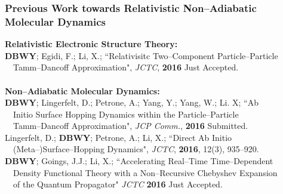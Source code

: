 \documentclass[usepdftitle=false,10pt]{beamer}
\begin{document}
\begin{frame}
  \frametitle{Previous Work towards Relativistic Non--Adiabatic Molecular Dynamics}

  {\Large \bf Relativistic Electronic Structure Theory:}\vspace{0.1cm}\\

  \textbf{DBWY}; Egidi, F.; Li, X.; ``Relativisitc Two--Component Particle--Particle
    \\$\quad$Tamm--Dancoff Approximation", \emph{JCTC}, \textbf{2016} Just Accepted.\\

  ~\\
  {\Large \bf Non--Adiabatic Molecular Dynamics:}\vspace{0.1cm}\\

  \textbf{DBWY}; Lingerfelt, D.; Petrone, A.; Yang, Y.; Yang, W.; Li. X;
    ``Ab \\$\quad$Initio Surface Hopping Dynamics within the Particle--Particle
    \\$\quad$Tamm--Dancoff Approximation", \emph{JCP Comm.}, \textbf{2016} Submitted.\\\vspace{0.20cm}
  Lingerfelt, D.; \textbf{DBWY}; Petrone, A.; Li, X.; ``Direct Ab Initio
    \\$\quad$(Meta--)Surface--Hopping Dynamics", \emph{JCTC}, \textbf{2016}, 12(3),
    935--920.\\\vspace{0.20cm}
  \textbf{DBWY}; Goings, J.J.; Li, X.; ``Accelerating Real--Time Time--Dependent
    \\$\quad$Density Functional Theory with a Non--Recursive Chebyshev Expansion 
    \\$\quad$of the Quantum Propagator" \emph{JCTC} \textbf{2016} Just Accepted.

\end{frame}
\end{document}
